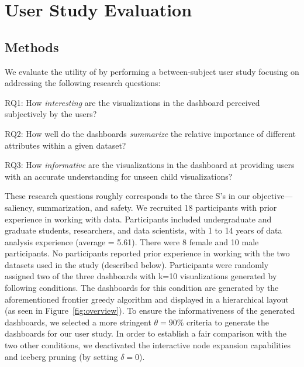 \section{User Study Evaluation\label{sec:userstudy}}
\subsection{Methods}
We evaluate the utility of \system by performing a between-subject user study focusing on addressing the following research questions:
\begin{denselist}
	\item RQ1: How \textit{interesting} are the visualizations in the dashboard perceived subjectively by the users?
	\item RQ2: How well do the dashboards \textit{summarize} the relative importance of different attributes within a given dataset?
	\item RQ3: How \textit{informative} are the visualizations in the dashboard at providing users with an accurate understanding for unseen child visualizations? %
\end{denselist}
These research questions roughly corresponds to the three S's in our objective---saliency, summarization, and safety.
We recruited 18 participants with prior experience in working with data. Participants included undergraduate and graduate students, researchers, and data scientists, with 1 to 14 years of data analysis experience (average = 5.61).  %
There were 8 female and 10 male participants. No participants reported prior experience in working with the two datasets used in the study (described below). Participants were randomly assigned two of the three dashboards with k=10 visualizations generated by following conditions. 
\stitle{\system:} The dashboards for this condition are generated by the aforementioned frontier greedy algorithm and displayed in a hierarchical layout (as seen in Figure~\ref{fig:overview}). To ensure the informativeness of the generated dashboards, we selected a more stringent $\theta = 90\%$ criteria to generate the dashboards for our user study. In order to establish a fair comparison with the two other conditions, we deactivated the interactive node expansion capabilities and iceberg pruning (by setting $\delta=0$).

